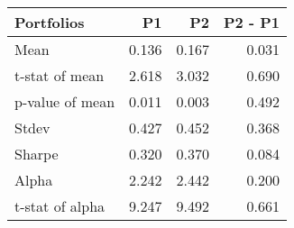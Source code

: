 \begin{tabular}{lrrr}
\toprule
Portfolios & P1 & P2 & P2 - P1 \\
\midrule
Mean & 0.136 & 0.167 & 0.031 \\
t-stat of mean & 2.618 & 3.032 & 0.690 \\
p-value of mean & 0.011 & 0.003 & 0.492 \\
Stdev & 0.427 & 0.452 & 0.368 \\
Sharpe & 0.320 & 0.370 & 0.084 \\
Alpha & 2.242 & 2.442 & 0.200 \\
t-stat of alpha & 9.247 & 9.492 & 0.661 \\
\bottomrule
\end{tabular}
